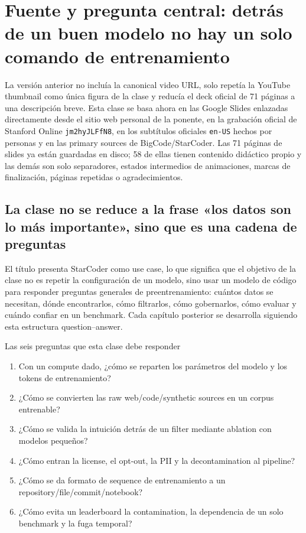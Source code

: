 \section{Fuente y pregunta central: detrás de un buen modelo no hay un solo comando de entrenamiento}

La versión anterior no incluía la canonical video URL, solo repetía la YouTube thumbnail como única figura de la clase y reducía el deck oficial de 71 páginas a una descripción breve. Esta clase se basa ahora en las Google Slides enlazadas directamente desde el sitio web personal de la ponente, en la grabación oficial de Stanford Online \texttt{jm2hyJLFfN8}, en los subtítulos oficiales \texttt{en-US} hechos por personas y en las primary sources de BigCode/StarCoder. Las 71 páginas de slides ya están guardadas en disco; 58 de ellas tienen contenido didáctico propio y las demás son solo separadores, estados intermedios de animaciones, marcas de finalización, páginas repetidas o agradecimientos.

\subsection{La clase no se reduce a la frase «los datos son lo más importante», sino que es una cadena de preguntas}

El título presenta StarCoder como use case, lo que significa que el objetivo de la clase no es repetir la configuración de un modelo, sino usar un modelo de código para responder preguntas generales de preentrenamiento: cuántos datos se necesitan, dónde encontrarlos, cómo filtrarlos, cómo gobernarlos, cómo evaluar y cuándo confiar en un benchmark. Cada capítulo posterior se desarrolla siguiendo esta estructura question--answer.



\begin{importantbox}{Las seis preguntas que esta clase debe responder}
\begin{enumerate}
  \item Con un compute dado, ¿cómo se reparten los parámetros del modelo y los tokens de entrenamiento?
  \item ¿Cómo se convierten las raw web/code/synthetic sources en un corpus entrenable?
  \item ¿Cómo se valida la intuición detrás de un filter mediante ablation con modelos pequeños?
  \item ¿Cómo entran la license, el opt-out, la PII y la decontamination al pipeline?
  \item ¿Cómo se da formato de sequence de entrenamiento a un repository/file/commit/notebook?
  \item ¿Cómo evita un leaderboard la contamination, la dependencia de un solo benchmark y la fuga temporal?
\end{enumerate}
\end{importantbox}

